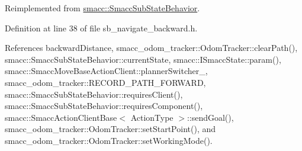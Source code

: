 Reimplemented from \hyperlink{classsmacc_1_1SmaccSubStateBehavior_a7c28e1c46238bbb2c2e0450573c6de94}{smacc\+::\+Smacc\+Sub\+State\+Behavior}.



Definition at line 38 of file sb\+\_\+navigate\+\_\+backward.\+h.



References backward\+Distance, smacc\+\_\+odom\+\_\+tracker\+::\+Odom\+Tracker\+::clear\+Path(), smacc\+::\+Smacc\+Sub\+State\+Behavior\+::current\+State, smacc\+::\+I\+Smacc\+State\+::param(), smacc\+::\+Smacc\+Move\+Base\+Action\+Client\+::planner\+Switcher\+\_\+, smacc\+\_\+odom\+\_\+tracker\+::\+R\+E\+C\+O\+R\+D\+\_\+\+P\+A\+T\+H\+\_\+\+F\+O\+R\+W\+A\+RD, smacc\+::\+Smacc\+Sub\+State\+Behavior\+::requires\+Client(), smacc\+::\+Smacc\+Sub\+State\+Behavior\+::requires\+Component(), smacc\+::\+Smacc\+Action\+Client\+Base$<$ Action\+Type $>$\+::send\+Goal(), smacc\+\_\+odom\+\_\+tracker\+::\+Odom\+Tracker\+::set\+Start\+Point(), and smacc\+\_\+odom\+\_\+tracker\+::\+Odom\+Tracker\+::set\+Working\+Mode().


